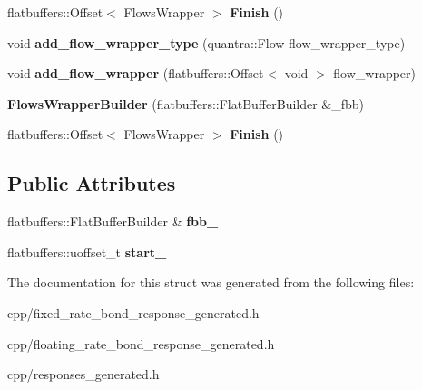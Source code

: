 \begin{DoxyCompactItemize}
flatbuffers\+::\+Offset$<$ Flows\+Wrapper $>$ {\bfseries Finish} ()
\item 
\mbox{\label{structquantra_1_1FlowsWrapperBuilder_ac88fc521bde3eb28fa78b7f1ff9902da}} 
void {\bfseries add\+\_\+flow\+\_\+wrapper\+\_\+type} (quantra\+::\+Flow flow\+\_\+wrapper\+\_\+type)
\item 
\mbox{\label{structquantra_1_1FlowsWrapperBuilder_adf8719e14aba6b9f2a24218fe0b662f9}} 
void {\bfseries add\+\_\+flow\+\_\+wrapper} (flatbuffers\+::\+Offset$<$ void $>$ flow\+\_\+wrapper)
\item 
\mbox{\label{structquantra_1_1FlowsWrapperBuilder_ae8823f486e0ed336bef2138f1f6b8119}} 
{\bfseries Flows\+Wrapper\+Builder} (flatbuffers\+::\+Flat\+Buffer\+Builder \&\+\_\+fbb)
\item 
\mbox{\label{structquantra_1_1FlowsWrapperBuilder_a966d0190ce307964791e62ab55bc49d3}} 
flatbuffers\+::\+Offset$<$ Flows\+Wrapper $>$ {\bfseries Finish} ()
\end{DoxyCompactItemize}
\subsection*{Public Attributes}
\begin{DoxyCompactItemize}
\item 
\mbox{\label{structquantra_1_1FlowsWrapperBuilder_a7a8f178abaddb93e7bfda94d57bcd9b3}} 
flatbuffers\+::\+Flat\+Buffer\+Builder \& {\bfseries fbb\+\_\+}
\item 
\mbox{\label{structquantra_1_1FlowsWrapperBuilder_aac91907b445b23e9ff564cd4dc63d8e9}} 
flatbuffers\+::uoffset\+\_\+t {\bfseries start\+\_\+}
\end{DoxyCompactItemize}


The documentation for this struct was generated from the following files\+:\begin{DoxyCompactItemize}
\item 
cpp/fixed\+\_\+rate\+\_\+bond\+\_\+response\+\_\+generated.\+h\item 
cpp/floating\+\_\+rate\+\_\+bond\+\_\+response\+\_\+generated.\+h\item 
cpp/responses\+\_\+generated.\+h\end{DoxyCompactItemize}
